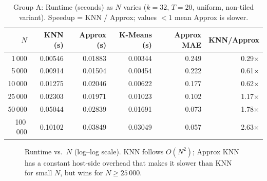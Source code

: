 \documentclass[11pt,a4paper]{article}
\begin{document}
\begin{table}[H]
\centering
\caption{Group A: Runtime (seconds) as $N$ varies ($k=32$, $T=20$, uniform,
non-tiled variant).  Speedup = KNN / Approx; values ${<}1$ mean Approx is slower.}
\label{tab:vary_n}
\begin{tabular}{rrrrrr}
\toprule
$N$ & KNN (s) & Approx (s) & K-Means (s) & Approx MAE & KNN/Approx \\
\midrule
1\,000   & 0.00546 & 0.01883 & 0.00344 & 0.249 & 0.29$\times$ \\
5\,000   & 0.00914 & 0.01504 & 0.00454 & 0.222 & 0.61$\times$ \\
10\,000  & 0.01275 & 0.02046 & 0.00622 & 0.177 & 0.62$\times$ \\
25\,000  & 0.02303 & 0.01971 & 0.01023 & 0.102 & 1.17$\times$ \\
50\,000  & 0.05044 & 0.02839 & 0.01691 & 0.073 & 1.78$\times$ \\
100\,000 & 0.10102 & 0.03849 & 0.03049 & 0.057 & 2.63$\times$ \\
\bottomrule
\end{tabular}
\end{table}

\begin{figure}[H]
\centering
{}
\caption{Runtime vs.\ $N$ (log--log scale).  KNN follows $O(N^2)$; Approx KNN
has a constant host-side overhead that makes it slower than KNN for small $N$,
but wins for $N \ge 25\,000$.}
\label{fig:vary_n}
\end{figure}
\end{document}
